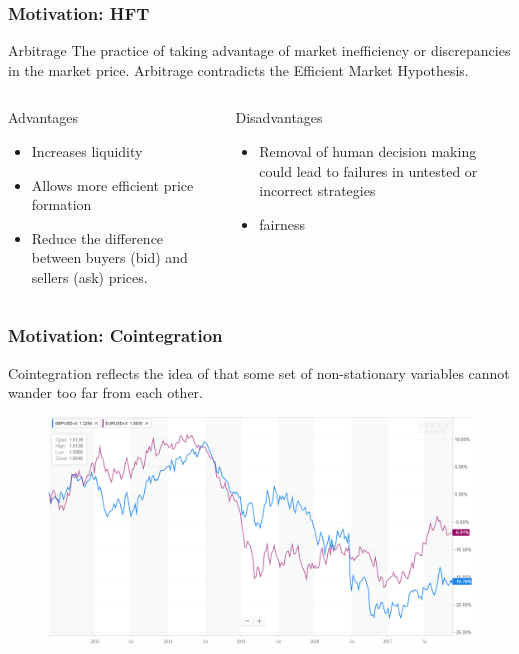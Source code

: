 \documentclass{beamer}
\begin{document}
\begin{frame}
\frametitle{Motivation: HFT}
\begin{alertblock}{Arbitrage}
The practice of taking advantage of market inefficiency or discrepancies in the market price. Arbitrage contradicts the Efficient Market Hypothesis. 
\end{alertblock}
\begin{columns}

\begin{column}{0.5\textwidth}
\begin{exampleblock}{Advantages}
\begin{itemize}
\item Increases liquidity
\item Allows more efficient price formation
\item Reduce the difference between buyers (bid) and sellers (ask) prices.
\end{itemize}
\end{exampleblock}
\end{column}
\begin{column}{0.5\textwidth}
\begin{exampleblock}{Disadvantages}
\begin{itemize}
\item Removal of human decision making could lead to failures in untested or incorrect strategies
\item fairness
\end{itemize}
\end{exampleblock}
\end{column}
\end{columns}
\end{frame}


\begin{frame}
\frametitle{Motivation: Cointegration}
Cointegration reflects the idea of that some set of non-stationary variables cannot wander too far from each other.
\begin{figure}
\includegraphics[width=0.8\paperwidth]{img/motivation}
\end{figure}
\end{frame}
\end{document}
